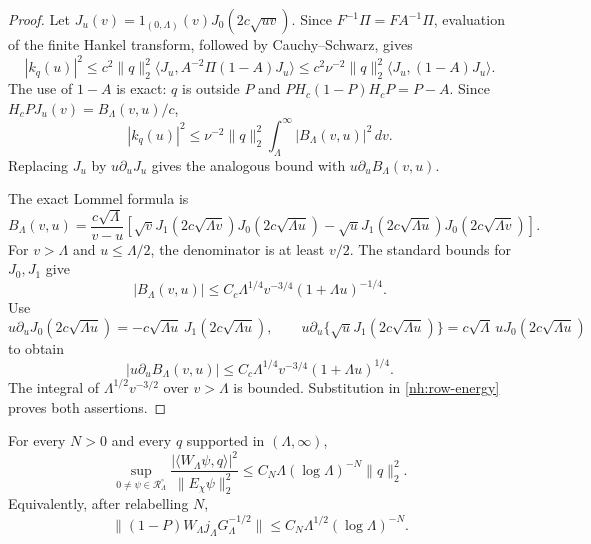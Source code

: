\begin{proof}
Let $J_u(v)=1_{(0,\Lambda)}(v)J_0(2c\sqrt{uv})$.
Since $F^{-1}\Pi=FA^{-1}\Pi$, evaluation of the finite
Hankel transform, followed by Cauchy--Schwarz, gives
\[
 |k_q(u)|^2
 \leq c^2\|q\|_2^2
       \langle J_u,A^{-2}\Pi(1-A)J_u\rangle
 \leq c^2\nu^{-2}\|q\|_2^2
       \langle J_u,(1-A)J_u\rangle.
\]
The use of $1-A$ is exact: $q$ is outside $P$ and
$P H_c(1-P)H_cP=P-A$.
Since $H_cPJ_u(v)=B_\Lambda(v,u)/c$,
\begin{equation}\label{nh:row-energy}
 |k_q(u)|^2\leq\nu^{-2}\|q\|_2^2
                 \int_\Lambda^\infty|B_\Lambda(v,u)|^2\,dv.
\end{equation}
Replacing $J_u$ by $u\partial_uJ_u$ gives the analogous
bound with $u\partial_uB_\Lambda(v,u)$.

The exact Lommel formula is
\[
 B_\Lambda(v,u)=\frac{c\sqrt\Lambda}{v-u}
 \left[
 \sqrt v J_1(2c\sqrt{\Lambda v})J_0(2c\sqrt{\Lambda u})
 -\sqrt u J_1(2c\sqrt{\Lambda u})J_0(2c\sqrt{\Lambda v})
 \right].
\]
For $v>\Lambda$ and $u\leq\Lambda/2$, the denominator is
at least $v/2$. The standard bounds for $J_0,J_1$ give
\[
 |B_\Lambda(v,u)|
 \leq C_c\Lambda^{1/4}v^{-3/4}(1+\Lambda u)^{-1/4}.
\]
Use
\[
 u\partial_uJ_0(2c\sqrt{\Lambda u})
       =-c\sqrt{\Lambda u}\,J_1(2c\sqrt{\Lambda u}),\qquad
 u\partial_u\{\sqrt u J_1(2c\sqrt{\Lambda u})\}
       =c\sqrt\Lambda\,uJ_0(2c\sqrt{\Lambda u})
\]
to obtain
\[
 |u\partial_uB_\Lambda(v,u)|
 \leq C_c\Lambda^{1/4}v^{-3/4}(1+\Lambda u)^{1/4}.
\]
The integral of $\Lambda^{1/2}v^{-3/2}$ over
$v>\Lambda$ is bounded. Substitution in
\eqref{nh:row-energy} proves both assertions.
\end{proof}

\begin{proposition}
\label{nh:functional}
For every $N>0$ and every $q$ supported in $(\Lambda,\infty)$,
\begin{equation}\label{nh:functional-bound}
 \sup_{0\ne\psi\in\mathcal R_\Lambda^\circ}
 \frac{|\langle W_\Lambda\psi,q\rangle|^2}
      {\|E_\chi\psi\|_2^2}
 \leq C_N\Lambda(\log\Lambda)^{-N}\|q\|_2^2.
\end{equation}
Equivalently, after relabelling $N$,
\begin{equation}\label{nh:normalized-extension}
 \|(1-P)W_\Lambda j_\Lambda G_\Lambda^{-1/2}\|
          \leq C_N\Lambda^{1/2}(\log\Lambda)^{-N}.
\end{equation}
\end{proposition}


